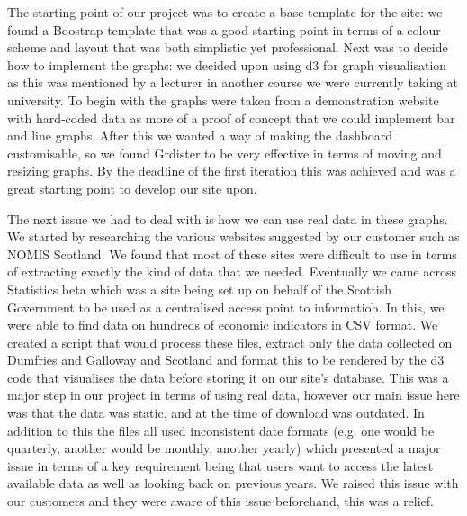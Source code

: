 \documentclass{l3proj}
\begin{document}
The starting point of our project was to create a base template for the site: we found a Boostrap template that was a good starting
point in terms of a colour scheme and layout that was both simplistic yet professional. Next was to decide how to implement the
graphs: we decided upon using d3 for graph visualisation as this was mentioned by a lecturer in another course we were currently
taking at university. To begin with the graphs were taken from a demonstration website with hard-coded data as more of a proof
of concept that we could implement bar and line graphs. After this we wanted a way of making the dashboard customisable, so we
found Grdister to be very effective in terms of moving and resizing graphs. By the deadline of the first iteration this was
achieved and was a great starting point to develop our site upon.

The next issue we had to deal with is how we can use real data in these graphs. We started by researching the various websites
suggested by our customer such as NOMIS Scotland. We found that most of these sites were difficult to use in terms of extracting
exactly the kind of data that we needed. Eventually we came across Statistics beta which was a site being set up on behalf of
the Scottish Government to be used as a centralised access point to informatiob. In this, we were able to find data on
hundreds of economic indicators in CSV format. We created a script that would process these files, extract only the data collected
on Dumfries and Galloway and Scotland and format this to be rendered by the d3 code that visualises the data before storing it on
our site's database. This was a major step in our project in terms of using real data, however our main issue here was that the
data was static, and at the time of download was outdated. In addition to this the files all used inconsistent date formats (e.g.
one would be quarterly, another would be monthly, another yearly) which presented a major issue in terms of a key requirement
being that users want to access the latest available data as well as looking back on previous years. We raised this issue
with our customers and they were aware of this issue beforehand, this was a relief.
\end{document}
